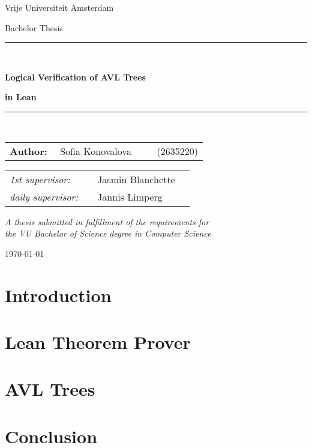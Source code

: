 \documentclass[11pt, oneside, a4paper]{book}
\theoremstyle{definition}
\begin{document}
\thispagestyle{empty}

\begin{center}

Vrije Universiteit Amsterdam

\vspace{1mm}


\vspace{1.5cm}

{\Large Bachelor Thesis}

\vspace*{1.5cm}

\rule{.9\linewidth}{.6pt}\\[0.4cm]
{\huge \bfseries Logical Verification of AVL Trees\par}
{\huge \bfseries in Lean\par}\vspace{0.4cm}
\rule{.9\linewidth}{.6pt}\\[1.5cm]

\vspace*{2mm}

{\Large
\begin{tabular}{l}
{\bf Author:} ~~Sofia Konovalova ~~~~ (2635220)
\end{tabular}
}

\vspace*{1.5cm}

\begin{tabular}{ll}
{\it 1st supervisor:}   & ~~Jasmin Blanchette \\
{\it daily supervisor:} & ~~Jannis Limperg ~~~~ \\
\end{tabular}

\vspace*{2cm}

\textit{A thesis submitted in fulfillment of the requirements for\\ the VU Bachelor of Science degree in Computer Science }

\vspace*{1cm}

\today\\[4cm] %

\end{center}

\tableofcontents

\chapter{Introduction}

\chapter{Lean Theorem Prover}


\chapter{AVL Trees}


\chapter{Conclusion}




\end{document}
